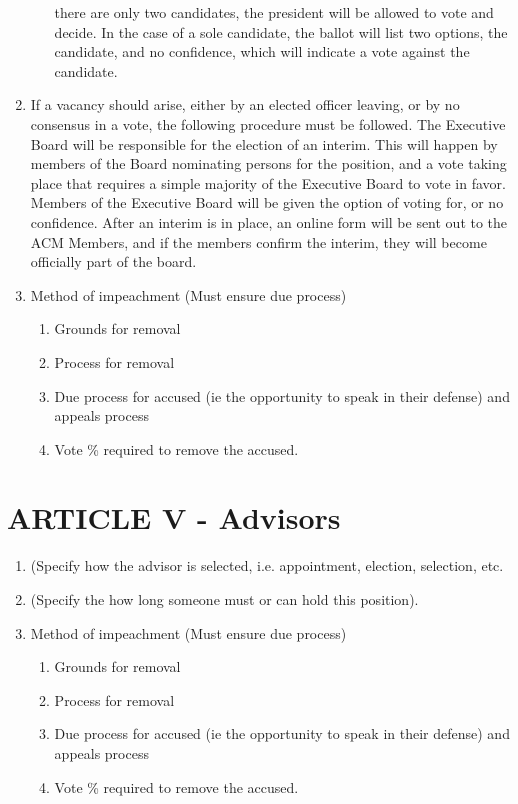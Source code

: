 \documentclass[11pt,a4paper,notitlepage]{article}
\begin{document}
\begin{enumerate}[label=\Alph*.]
\begin{enumerate}[label=\arabic*.]
      there are only two candidates, the president will be allowed to vote and
      decide. In the case of a sole candidate, the ballot will list two options,
      the candidate, and no confidence, which will indicate a vote against the candidate.
    \end{enumerate}
  \item If a vacancy should arise, either by an elected officer leaving, or by
  no consensus in a vote, the following procedure must be followed. The
  Executive Board will be responsible for the election of an interim. This will
  happen by members of the Board nominating persons for the position, and a vote
  taking place that requires a simple majority of the Executive Board to vote in
  favor. Members of the Executive Board will be given the option of voting for,
  or no confidence. After an interim is in place, an online form will be sent
  out to the ACM Members, and if the members confirm the interim, they will
  become officially part of the board.
  \item Method of impeachment (Must ensure due process)
    \begin{enumerate}[label=\arabic*.]
      \item Grounds for removal
      \item Process for removal
      \item Due process for accused (ie the opportunity to speak in their
      defense) and appeals process
      \item Vote \% required to remove the accused.
    \end{enumerate}
  \end{enumerate}

\section*{ARTICLE V - Advisors}
\begin{enumerate}[label=\Alph*.]
  \item	(Specify how the advisor is selected, i.e. appointment, election,
  selection, etc.
  \item (Specify the how long someone must or can hold this position).
  \item Method of impeachment (Must ensure due process)
    \begin{enumerate}[label=\arabic*.]
      \item Grounds for removal
      \item Process for removal
      \item Due process for accused (ie the opportunity to speak in their
      defense) and appeals process
      \item Vote \% required to remove the accused.
    \end{enumerate}
\end{enumerate}
\end{document}
